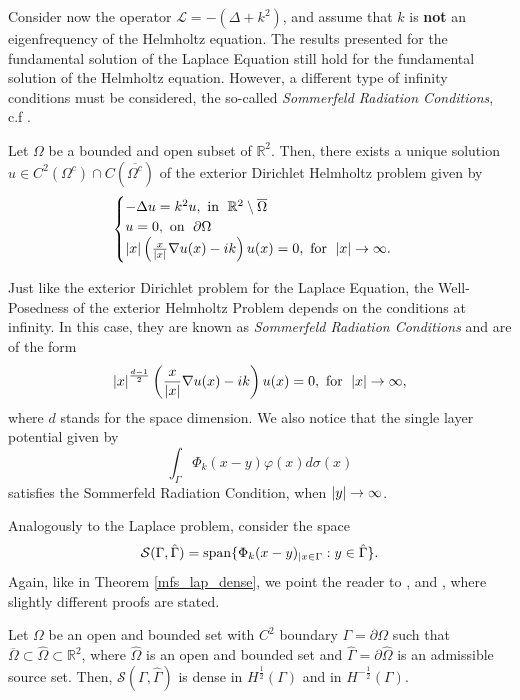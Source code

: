 Consider now the operator \(\mathcal{L} = -(\Delta + k^2)\), and assume that \(k\) is \textbf{not} an eigenfrequency of the Helmholtz equation. The results presented for the fundamental solution of the Laplace Equation still hold for the fundamental solution of the Helmholtz equation. However, a different type of infinity conditions must be considered, the so-called \textit{Sommerfeld Radiation Conditions}, c.f \cite{colton2013integral}. 
\begin{theorem}
    Let \(\Omega\) be a bounded and open subset of \(\mathbb{R}^2\). Then, there exists a unique solution \(u \in C^2(\Omega^c) \cap C(\overline{\Omega^c})\) of the exterior Dirichlet Helmholtz problem given by
    \[
        \begin{cases}
            -\Delta u = k^2 u, \text{ in } \; \mathbb{R}^2\setminus \overline{\Omega}\\
            u = 0, \text{ on } \; \partial \Omega\\
            \abs{x} \left(\frac{x}{\abs{x}}\nabla u(x) - i k\right)u(x) = 0, \text{ for } \; \abs{x} \rightarrow \infty.
        \end{cases}
    \]
\end{theorem}
\begin{remark}
    Just like the exterior Dirichlet problem for the Laplace Equation, the Well-Posedness of the exterior Helmholtz Problem depends on the conditions at infinity. In this case, they are known as \textit{Sommerfeld Radiation Conditions} and are of the form
    \[
        \abs{x}^\frac{d-1}{2} \left(\frac{x}{\abs{x}}\nabla u(x) - i k \right)u(x) = 0, \text{ for } \; \abs{x} \rightarrow \infty,
    \]
    where \(d\) stands for the space dimension. We also notice that the single layer potential given by
    \[
        \int_\Gamma \Phi_k(x-y) \varphi(x) d\sigma(x)
    \]
    satisfies the Sommerfeld Radiation Condition, when \(\abs{y} \rightarrow \infty\).
\end{remark}
Analogously to the Laplace problem, consider the space
\[
    \mathcal{S}(\Gamma, \hat{\Gamma}) = \operatorname{span}\{\Phi_k(x-y)_{|x \in \Gamma} : y \in \hat{\Gamma}\}.
\]
Again, like in Theorem \eqref{mfs_lap_dense}, we point the reader to \cite{alves2009choice}, \cite{svilen_phd} and \cite{alves2005new}, where slightly different proofs are stated.
\begin{theorem}
    Let \(\Omega\) be an open and bounded set with \(C^2\) boundary \(\Gamma = \partial \Omega\) such that \(\overline{\Omega} \subset \hat{\Omega} \subset \mathbb{R}^2\), where \(\hat{\Omega}\) is an open and bounded set and \(\hat{\Gamma} = \partial \hat{\Omega}\) is an admissible source set. Then, \(\mathcal{S}(\Gamma, \hat{\Gamma})\) is dense in \(H^\frac{1}{2}(\Gamma)\) and in \(H^{-\frac{1}{2}}(\Gamma)\).
\end{theorem}\label{mfs_helm_dense}
